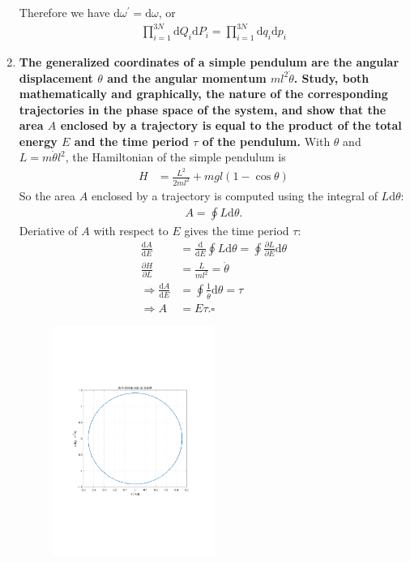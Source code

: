 \documentclass[../../main.tex]{subfiles}
\begin{document}
\begin{enumerate}
  Therefore we have $\mathrm{d}\omega^{\prime} = \mathrm{d}\omega$, or 
  \begin{align*}
    \prod_{i=1}^{3N}\mathrm{d}Q_{i}\mathrm{d}P_{i} = \prod_{i=1}^{3N}\mathrm{d}q_{i}\mathrm{d}p_{i}
  \end{align*}

  \item \textbf{The generalized coordinates of a simple pendulum are the angular displacement $\theta$ and the angular momentum $ml^{2}\dot{\theta}$. Study, both mathematically and graphically, the nature of the corresponding trajectories in the phase space of the system, and show that the area $A$ enclosed by a trajectory is equal to the product of the total energy $E$ and the time period $\tau$ of the pendulum.}
  With $\theta$ and $L = m\dot{\theta}l^{2}$, the Hamiltonian of the simple pendulum is
  \begin{align*}
    H &= \frac{L^{2}}{2ml^{2}} + mgl(1-\cos\theta)
  \end{align*}
  So the area $A$ enclosed by a trajectory is computed using the integral of $L\mathrm{d}\theta$:
  \begin{align*}
    A = \oint L\mathrm{d}\theta.
  \end{align*}
  Deriative of $A$ with respect to $E$ gives the time period $\tau$:
  \begin{align*}
    \frac{\mathrm{d}A}{\mathrm{d}E} &= \frac{\mathrm{d}}{\mathrm{d}E}\oint L\mathrm{d}\theta = \oint\frac{\partial L}{\partial E}\mathrm{d}\theta\\
    \frac{\partial H}{\partial L} &= \frac{L}{ml^{2}} = \dot{\theta}\\
    \Rightarrow \frac{\mathrm{d}A}{\mathrm{d}E} &= \oint\frac{1}{\dot{\theta}}\mathrm{d}\theta = \tau\\
    \Rightarrow A &= E\tau. \square
  \end{align*}

\begin{figure}[!htbp]  
		\centering
		\includegraphics[width=0.5\textwidth,height=0.7\textwidth]{fig/phase-space.pdf}
	\end{figure}
\end{enumerate}
\end{document}
